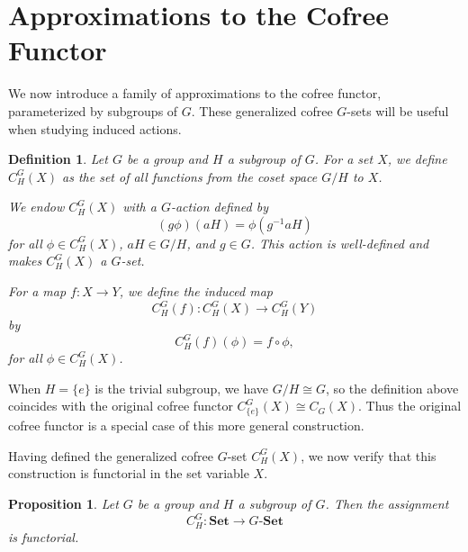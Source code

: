 \documentclass[10pt,a4paper]{amsart}
\newtheorem{proposition}{Proposition}
\newtheorem{definition}{Definition}
\begin{document}
\section{Approximations to the Cofree Functor}
\label{sec:approx}

We now introduce a family of approximations to the cofree functor, parameterized by subgroups of $G$. These generalized cofree $G$-sets will be useful when studying induced actions.

\begin{definition}\label{def:cofree_induced}
Let $G$ be a group and $H$ a subgroup of $G$. For a set $X$, we define $C_H^G(X)$ as the set of all functions from the coset space $G/H$ to $X$.

We endow $C_H^G(X)$ with a $G$-action defined by
\[
(g \phi)(aH) = \phi(g^{-1}aH)
\]
for all $\phi \in C_H^G(X)$, $aH \in G/H$, and $g \in G$. This action is well-defined and makes $C_H^G(X)$ a $G$-set.

For a map $f \colon X \longrightarrow Y$, we define the induced map
\[
C_H^G(f) \colon C_H^G(X) \longrightarrow C_H^G(Y)
\]
by
\[
C_H^G(f)(\phi) = f \circ \phi,
\]
for all $\phi \in C_H^G(X)$.
\end{definition}

When $H = \{e\}$ is the trivial subgroup, we have $G/H \cong G$, so the definition above coincides with the original cofree functor $C_{\{e\}}^G(X) \cong C_G(X)$. Thus the original cofree functor is a special case of this more general construction.

Having defined the generalized cofree $G$-set $C_H^G(X)$, we now verify that this construction is functorial in the set variable $X$.

\begin{proposition}\label{prop:cofree_induced_functor}
Let $G$ be a group and $H$ a subgroup of $G$. Then the assignment
\[
C_H^G \colon \mathbf{Set} \longrightarrow G\text{-}\mathbf{Set}
\]
is functorial.
\end{proposition}
\end{document}
